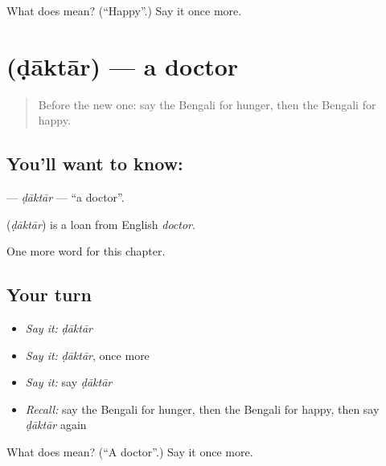 \begin{tcolorbox}[breakable,colback=teal!4,colframe=teal!35!black,title={Before you move on}]
What does  mean? (\textquotedblleft{}Happy\textquotedblright{}.) Say it once more.
\end{tcolorbox}
\section[\texorpdfstring{\bn{ডাক্তার} (ḍāktār)}{ডাক্তার (ḍāktār)}]{ (ḍāktār) — a doctor}

\label{lesson:BN-C45-daktar}



\begin{quote}
Before the new one: say the Bengali for hunger, then the Bengali for happy.
\end{quote}

\subsection*{You'll want to know: }
\textbf{} — \emph{ḍāktār} — \textquotedblleft{}a doctor\textquotedblright{}.

\begin{cousinweb}
\textbf{} (\emph{ḍāktār}) is a loan from English \emph{doctor}.
\end{cousinweb}

\begin{grammarlens}[title={What you've built}]
One more word for this chapter.
\end{grammarlens}

\subsection*{Your turn}
\begin{itemize}
\raggedright
  \item \emph{Say it:} \emph{ḍāktār}
  \item \emph{Say it:} \emph{ḍāktār}, once more
  \item \emph{Say it:} say \emph{ḍāktār}
  \item \emph{Recall:} say the Bengali for hunger, then the Bengali for happy, then say \emph{ḍāktār} again
\end{itemize}

\begin{tcolorbox}[breakable,colback=teal!4,colframe=teal!35!black,title={Before you move on}]
What does  mean? (\textquotedblleft{}A doctor\textquotedblright{}.) Say it once more.
\end{tcolorbox}
